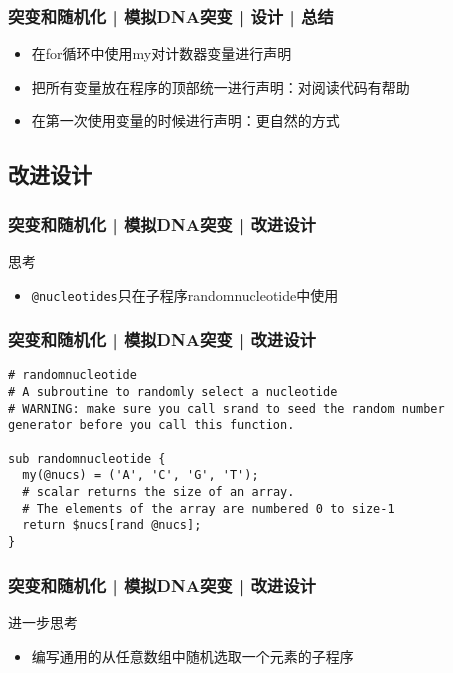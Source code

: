 \begin{frame}[fragile]
  \frametitle{突变和随机化 | 模拟DNA突变 | 设计 | \alert{总结}}
  \begin{itemize}
    \item 在for循环中使用my对计数器变量进行声明
    \item 把所有变量放在程序的顶部统一进行声明：对阅读代码有帮助
    \item 在第一次使用变量的时候进行声明：更自然的方式
  \end{itemize}
\end{frame}

\subsection{改进设计}
\begin{frame}[fragile]
  \frametitle{突变和随机化 | 模拟DNA突变 | 改进设计}
  \begin{block}{思考}
    \begin{itemize}
      \item \verb|@nucleotides|只在子程序randomnucleotide中使用
    \end{itemize}
  \end{block}
\end{frame}

\begin{frame}[fragile]
  \frametitle{突变和随机化 | 模拟DNA突变 | 改进设计}
\begin{lstlisting}
# randomnucleotide
# A subroutine to randomly select a nucleotide
# WARNING: make sure you call srand to seed the random number generator before you call this function.

sub randomnucleotide {
  my(@nucs) = ('A', 'C', 'G', 'T');
  # scalar returns the size of an array. 
  # The elements of the array are numbered 0 to size-1
  return $nucs[rand @nucs];
}
\end{lstlisting}
\end{frame}

\begin{frame}[fragile]
  \frametitle{突变和随机化 | 模拟DNA突变 | 改进设计}
  \begin{block}{进一步思考}
    \begin{itemize}
      \item 编写通用的从任意数组中随机选取一个元素的子程序
    \end{itemize}
  \end{block}
\end{frame}

